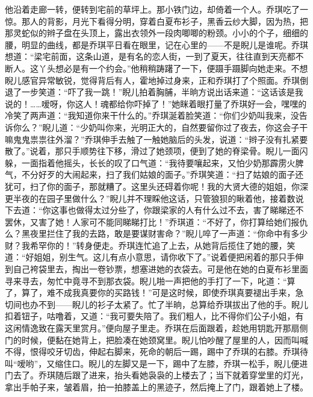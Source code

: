 \par 他沿着走廊一转，便转到宅前的草坪上。那小铁门边，却倚着一个人。乔琪吃了一惊。那人的背影，月光下看得分明，穿着白夏布衫子，黑香云纱大脚，因为热，把那灵蛇似的辫子盘在头顶上，露出衣领外一段肉唧唧的粉颈。小小的个子，细细的腰，明显的曲线，都是乔琪平日看在眼里，记在心里的——不是睨儿是谁呢。乔琪想道：“梁宅前面，这条山道，是有名的恋人街，一到了夏天，往往直到天亮都不断人。这丫头想必是有一个约会。”他稍稍踌躇了一下，便蹑手蹑脚向她走来。不想睨儿感官异常敏锐，觉得背后有人，霍地掉过身来，正和乔琪打了个照面。乔琪倒退了一步笑道：“吓了我一跳！”睨儿拍着胸脯，半晌方说出话来道：“这话该是我说的！……嗳呀，你这人！魂都给你吓掉了！”她眯着眼打量了乔琪好一会，嘿嘿的冷笑了两声道：“我知道你来干什么的。”乔琪涎着脸笑道：“你们少奶叫我来，没告诉你么？”睨儿道：“少奶叫你来，光明正大的，自然要留你过了夜去，你这会子干嘛鬼鬼祟祟往外溜？”乔琪伸手去触了一触她脑后的头发，说道：“辫子没有扎紧要散了。”说着，那只手顺势往下移，滑过了她颈项，便到了她的脊梁骨。睨儿一面闪躲，一面指着他摇头，长长的叹了口气道：“我待要嚷起来，又怕少奶那霹雳火脾气，不分好歹的大闹起来，扫了我们姑娘的面子。”乔琪笑道：“扫了姑娘的面子还犹可，扫了你的面子，那就糟了。这里头还碍着你呢！我的大贤大德的姐姐，你深更半夜的在园子里做什么？”睨儿并不理睬他这话，只管狼狈的瞅着他，接着数说下去道：“你这事也做得太过分些了，你跟梁家的人有什么过不去，害了睇睇还不罢休，又害了她！人家可不能同睇睇打比！”乔琪道：“不好了，你打算给她们报仇么？黑夜里拦住了我的去路，敢是要谋财害命？”睨儿啐了一声道：“你命中有多少财？我希罕你的！”转身便走。乔琪连忙追了上去，从她背后揽住了她的腰，笑道：“好姐姐，别生气。这儿有点小意思，请你收下了。”说着便把闲着的那只手伸到自己袴袋里去，掏出一卷钞票，想塞进她的衣袋去。可是他在她的白夏布衫里面寻来寻去，匆忙中竟寻不到那衣袋。睨儿啪一声把他的手打了一下，叱道：“算了，算了，难不成我真要你的买路钱！”可是这时候，即使乔琪真要褪出手来，急切间也办不到——睨儿的衫子太紧了。忙了半晌，总算给乔琪拔出了他的手。睨儿扣着钮子，咕噜着，又道：“我可要失陪了。我们粗人，比不得你们公子小姐，有这闲情逸致在露天里赏月。”便向屋子里走。乔琪在后面跟着，趁她用钥匙开那扇侧门的时候，便黏在她背上，把脸凑在她颈窝里。睨儿怕吵醒了屋里的人，因而叫喊不得，恨得咬牙切齿，伸起右脚来，死命的朝后一踢，踢中了乔琪的右膝。乔琪待叫“嗳哟”，又缩住口。睨儿的左脚又是一下，踢中了左膝，乔琪一松手，睨儿便进门去了。乔琪随后跟了进来，抬头看她袅袅的上楼去了；当下就着穿堂里的灯光，拿出手帕子来，皱着眉，拍一拍膝盖上的黑迹子，然后掩上了门，跟着她上了楼。

